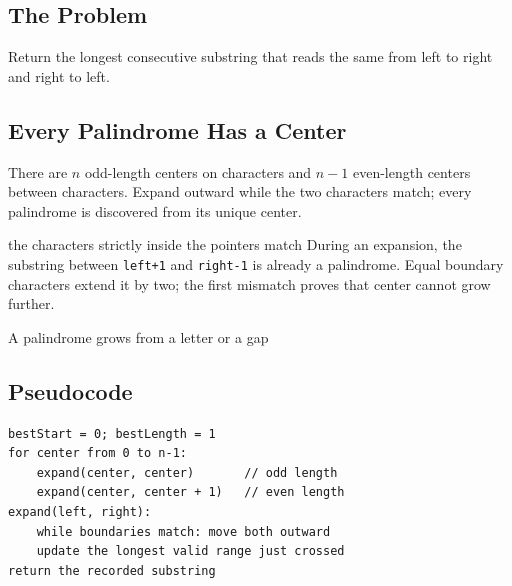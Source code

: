 
\subsection{The Problem}
Return the longest consecutive substring that reads the same from left to
right and right to left.

\subsection{Every Palindrome Has a Center}
There are \(n\) odd-length centers on characters and \(n-1\) even-length
centers between characters. Expand outward while the two characters match;
every palindrome is discovered from its unique center.

\begin{invariantbox}{the characters strictly inside the pointers match}
During an expansion, the substring between \texttt{left+1} and
\texttt{right-1} is already a palindrome. Equal boundary characters extend it
by two; the first mismatch proves that center cannot grow further.
\end{invariantbox}

\begin{visualbox}{A palindrome grows from a letter or a gap}
\centering
{}
\end{visualbox}

\subsection{Pseudocode}
\begin{lstlisting}[style=pseudocode]
bestStart = 0; bestLength = 1
for center from 0 to n-1:
    expand(center, center)       // odd length
    expand(center, center + 1)   // even length
expand(left, right):
    while boundaries match: move both outward
    update the longest valid range just crossed
return the recorded substring
\end{lstlisting}


